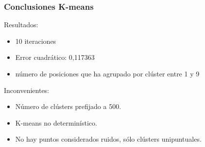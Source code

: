 \documentclass[10pt, spanish]{beamer}
\begin{document}
\begin{frame}[fragile]
\frametitle{Conclusiones K-means}

Resultados:
\begin{itemize}
\item 10 iteraciones 
\item Error cuadr\'atico: 0,117363
\item n\'umero de posiciones que ha agrupado por cl\'uster entre 1 y 9
\end{itemize}

\bigskip

Inconvenientes:
\begin{itemize}
	\item N\'umero de cl\'usters prefijado a 500.
	\item K-means no determin\'istico.
	\item No hay puntos considerados ruidos, s\'olo cl\'usters unipuntuales.
\end{itemize}
\end{frame}


\end{document}
